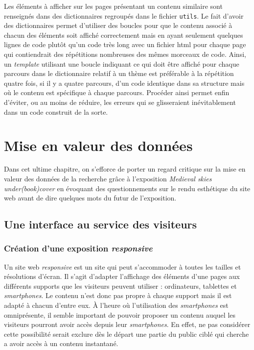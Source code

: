 	Les éléments à afficher sur les pages présentant un contenu similaire sont renseignés dans des dictionnaires regroupés dans le fichier \texttt{utils}. Le fait d'avoir des dictionnaires permet d'utiliser des boucles pour que le contenu associé à chacun des éléments soit affiché correctement mais en ayant seulement quelques lignes de code plutôt qu'un code très long avec un fichier \acrshort{html} pour chaque page qui contiendrait des répétitions nombreuses des mêmes morceaux de code. Ainsi, un \textit{template} utilisant une boucle indiquant ce qui doit être affiché pour chaque parcours dans le dictionnaire relatif à un thème est préférable à la répétition quatre fois, si il y a quatre parcours, d'un code identique dans sa structure mais où le contenu est spécifique à chaque parcours. Procéder ainsi permet enfin d'éviter, ou au moins de réduire, les erreurs qui se glisseraient inévitablement dans un code construit de la sorte. 
	
	\chapter{Mise en valeur des données}
	Dans cet ultime chapitre, on s'efforce de porter un regard critique sur la mise en valeur des données de la recherche grâce à l'exposition \textit{Medieval skies under(book)cover} en évoquant des questionnements sur le rendu esthétique du site web avant de dire quelques mots du futur de l'exposition.
	\section{Une interface au service des visiteurs}
	\subsection{Création d'une exposition \textit{responsive}}
	Un site web \textit{responsive} est un site qui peut s'accommoder à toutes les tailles et résolutions d'écran. Il s'agit d'adapter l'affichage des éléments d'une pages aux différents supports que les visiteurs peuvent utiliser : ordinateurs, tablettes et \textit{smartphones}. Le contenu n'est donc pas propre à chaque support mais il est adapté à chacun d'entre eux.  À l'heure où l'utilisation des \textit{smartphones} est omniprésente, il semble important de pouvoir proposer un contenu auquel les visiteurs pourront avoir accès depuis leur \textit{smartphones}. En effet, ne pas considérer cette possibilité serait exclure dès le départ une partie du public ciblé qui cherche a avoir accès à un contenu instantané. 
	
